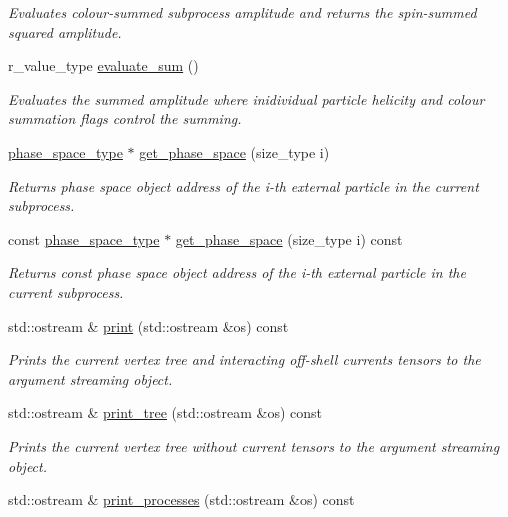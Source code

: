 \begin{DoxyCompactItemize}
\begin{DoxyCompactList}\small\item\em Evaluates colour-\/summed subprocess amplitude and returns the spin-\/summed squared amplitude. \end{DoxyCompactList}\item 
r\+\_\+value\+\_\+type \hyperlink{a00065_a6071cbab036da4c1a9d8d00eb7c0609c}{evaluate\+\_\+sum} ()
\begin{DoxyCompactList}\small\item\em Evaluates the summed amplitude where inidividual particle helicity and colour summation flags control the summing. \end{DoxyCompactList}\item 
\hyperlink{a00406}{phase\+\_\+space\+\_\+type} $\ast$ \hyperlink{a00065_a9b3d790cf4f6323684efeda68aab814d}{get\+\_\+phase\+\_\+space} (size\+\_\+type i)
\begin{DoxyCompactList}\small\item\em Returns phase space object address of the i-\/th external particle in the current subprocess. \end{DoxyCompactList}\item 
const \hyperlink{a00406}{phase\+\_\+space\+\_\+type} $\ast$ \hyperlink{a00065_af40f66d9e09e8f7e14f61ddab73b2a5e}{get\+\_\+phase\+\_\+space} (size\+\_\+type i) const 
\begin{DoxyCompactList}\small\item\em Returns const phase space object address of the i-\/th external particle in the current subprocess. \end{DoxyCompactList}\item 
std\+::ostream \& \hyperlink{a00065_a4f1be4b979e9a01b6699018c3ea650d6}{print} (std\+::ostream \&os) const 
\begin{DoxyCompactList}\small\item\em Prints the current vertex tree and interacting off-\/shell currents tensors to the argument streaming object. \end{DoxyCompactList}\item 
std\+::ostream \& \hyperlink{a00065_a36305ac3639cd8043742422e33f17d2e}{print\+\_\+tree} (std\+::ostream \&os) const 
\begin{DoxyCompactList}\small\item\em Prints the current vertex tree without current tensors to the argument streaming object. \end{DoxyCompactList}\item 
\hypertarget{a00065_aebd0e3d1bc1bad0857ea4ceff5e13299}{}std\+::ostream \& \hyperlink{a00065_aebd0e3d1bc1bad0857ea4ceff5e13299}{print\+\_\+processes} (std\+::ostream \&os) const \label{a00065_aebd0e3d1bc1bad0857ea4ceff5e13299}


\end{DoxyCompactItemize}
